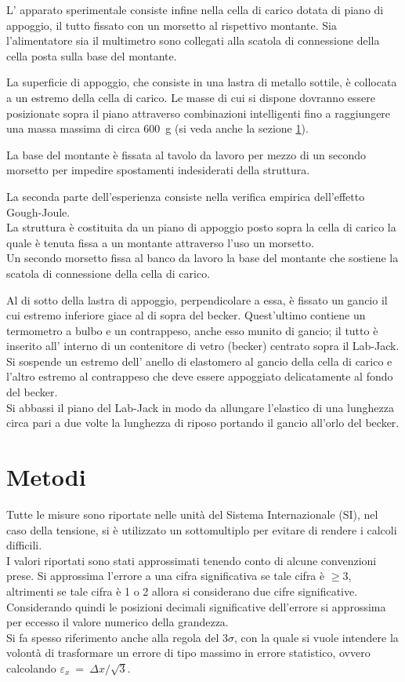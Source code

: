 \documentclass[italian, a4paper, 10pt, twocolumn]{../../style/lab_unige}
\newcommand{\treSigma}{$3\sigma$}
\newcommand{\mstdErr}[1]{\varepsilon_{#1}}
\begin{document}
    L’ apparato sperimentale consiste infine nella cella di carico dotata di piano di appoggio, il tutto fissato con un morsetto al  rispettivo montante. Sia l’alimentatore sia il multimetro sono collegati alla scatola di connessione della cella posta sulla base del montante.

    La superficie di appoggio, che  consiste in una lastra di metallo sottile, è collocata a un estremo della cella di carico.  Le masse di cui si dispone dovranno essere posizionate sopra il piano attraverso combinazioni intelligenti fino a raggiungere una massa massima di circa 600~g (si veda anche la sezione \ref{section:methods}).

    La base del montante è fissata al tavolo da lavoro per mezzo di un secondo morsetto per impedire spostamenti indesiderati della struttura.

    La seconda parte dell’esperienza consiste nella verifica empirica dell’effetto Gough-Joule.\\
    La struttura è costituita da un piano di appoggio posto sopra la cella di carico la quale è tenuta fissa a un montante attraverso l’uso un morsetto.\\
    Un secondo morsetto fissa al banco da lavoro la base del montante che sostiene la scatola di connessione della cella di carico.
    
    Al di sotto della lastra di appoggio, perpendicolare a essa, è fissato un gancio il cui estremo inferiore giace al di sopra del becker. Quest’ultimo contiene un termometro a bulbo e un contrappeso, anche esso munito di gancio; il tutto è inserito all’ interno di un contenitore di vetro (becker) centrato sopra il Lab-Jack.\\
    Si sospende un estremo dell’ anello di elastomero al gancio della cella di carico e l’altro estremo al contrappeso che deve essere appoggiato delicatamente al fondo del becker.\\
    Si abbassi il piano del Lab-Jack in modo da allungare l’elastico di una lunghezza circa pari a due volte la lunghezza di riposo portando il gancio all’orlo del becker. 
    
    \section{Metodi}
    \label{section:methods}

    Tutte le misure sono riportate nelle unità del Sistema Internazionale (SI), nel caso della tensione, si è utilizzato un sottomultiplo per evitare di rendere i calcoli difficili.\\
    I valori riportati sono stati approssimati tenendo conto di alcune convenzioni prese. Si approssima l'errore a una cifra significativa se tale cifra è $\geqslant3$, altrimenti se tale cifra è 1 o 2 allora si considerano due cifre significative. Considerando quindi le posizioni decimali significative dell'errore si approssima per eccesso il valore numerico della grandezza.\\
    Si fa spesso riferimento anche alla regola del \treSigma, con la quale si vuole intendere la volontà di trasformare un errore di tipo massimo in errore statistico, ovvero calcolando $\mstdErr{x}~=~\Delta x/\sqrt{3}$.\\
\end{document}
